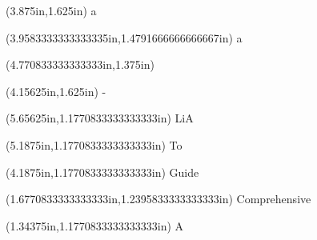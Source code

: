 \documentclass{article}
\begin{document}
\begin{textblock*}{8.0in}(3.875in,1.625in)
\fontsize{12.00}{14.40}\selectfont
a
\end{textblock*}
\begin{textblock*}{8.0in}(3.9583333333333335in,1.4791666666666667in)
\fontsize{3.75}{4.50}\selectfont
a
\end{textblock*}
\begin{textblock*}{8.0in}(4.770833333333333in,1.375in)
\fontsize{3.75}{4.50}
\end{textblock*}
\begin{textblock*}{8.0in}(4.15625in,1.625in)
\fontsize{21.75}{26.10}\selectfont
-
\end{textblock*}
\begin{textblock*}{8.0in}(5.65625in,1.1770833333333333in)
\fontsize{19.50}{23.40}\selectfont
LiA
\end{textblock*}
\begin{textblock*}{8.0in}(5.1875in,1.1770833333333333in)
\fontsize{19.50}{23.40}\selectfont
To
\end{textblock*}
\begin{textblock*}{8.0in}(4.1875in,1.1770833333333333in)
\fontsize{19.50}{23.40}\selectfont
Guide
\end{textblock*}
\begin{textblock*}{8.0in}(1.6770833333333333in,1.2395833333333333in)
\fontsize{24.00}{28.80}\selectfont
Comprehensive
\end{textblock*}
\begin{textblock*}{8.0in}(1.34375in,1.1770833333333333in)
\fontsize{19.50}{23.40}\selectfont
A
\end{textblock*}
\end{document}
